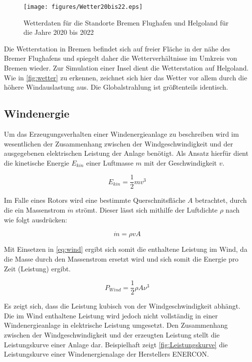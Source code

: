 \begin{figure}[H]
	\centering
	\texttt{[image: figures/Wetter20bis22.eps]}
	\caption{Wetterdaten für die Standorte Bremen Flughafen und Helgoland für die Jahre 2020 bis 2022}
	\label{fig:wetter}
\end{figure}

Die Wetterstation in Bremen befindet sich auf freier Fläche in der nähe des Bremer Flughafens und spiegelt daher die Wetterverhältnisse im Umkreis von Bremen wieder. Zur Simulation einer Insel dient die Wetterstation auf Helgoland. Wie in \autoref{fig:wetter} zu erkennen, zeichnet sich hier das Wetter vor allem durch die höhere Windauslastung aus. Die Globalstrahlung ist größtenteils identisch.

\subsection{Windenergie}

Um das Erzeugungsverhalten einer Windenergieanlage zu beschreiben wird im wesentlichen der Zusammenhang zwischen der Windgeschwindigkeit und der ausgegebenen elektrischen Leistung der Anlage benötigt. Als Ansatz hierfür dient die kinetische Energie $E_{kin}$ einer Luftmasse $m$ mit der Geschwindigkeit $v$. \cite{Hau2016}

\begin{equation}
	E_{kin} = \frac{1}{2} mv^3
	\label{eq:wind}
\end{equation}

Im Falle eines Rotors wird eine bestimmte Querschnitsfläche $A$ betrachtet, durch die ein Massenstrom $\dot{m}$ strömt. Dieser lässt sich mithilfe der Luftdichte $\rho$ nach \cite{Hau2016} wie folgt ausdrücken:

\begin{equation}
	\dot{m} = \rho vA
\end{equation}

Mit Einsetzen in \autoref{eq:wind} ergibt sich somit die enthaltene Leistung im Wind, da die Masse durch den Massenstrom ersetzt wird und sich somit die Energie pro Zeit (Leistung) ergibt.

\begin{equation}
	P_{Wind} = \frac{1}{2}\rho A \nu^3
\end{equation}

Es zeigt sich, dass die Leistung kubisch von der Windgeschwindigkeit abhängt. Die im Wind enthaltene Leistung wird jedoch nicht vollständig in einer Windenergieanlage in elektrische Leistung umgesetzt. Den Zusammenhang zwischen der Windgeschwindigkeit und der erzeugten Leistung stellt die Leistungskurve einer Anlage dar. Beispielhaft zeigt \autoref{fig:Leistungskurve} die Leistungskurve einer Windenergienalage der Herstellers ENERCON. 

